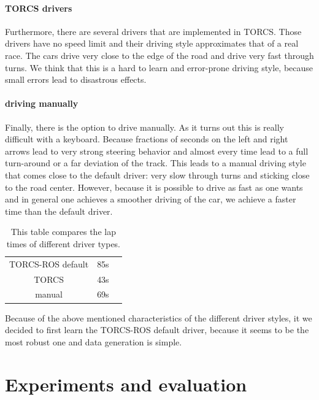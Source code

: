 \documentclass[10pt,a4paper,twoside,journal]{IEEEtran}
\begin{document}
\paragraph{TORCS drivers}
Furthermore, there are several drivers that are implemented in TORCS. Those drivers have no speed limit and their driving style approximates that of a real race. The cars drive very close to the edge of the road and drive very fast through turns. We think that this is a hard to learn and error-prone driving style, because small errors lead to disastrous effects.
\paragraph{driving manually}
Finally, there is the option to drive manually. As it turns out this is really difficult with a keyboard. Because fractions of seconds on the left and right arrows lead to very strong steering behavior and almost every time lead to a full turn-around or a far deviation of the track. This leads to a manual driving style that comes close to the default driver: very slow through turns and sticking close to the road center. However, because it is possible to drive as fast as one wants and in general one achieves a smoother driving of the car, we achieve a faster time than the default driver. \\

\begin{table}[ht]
	\centering
		\begin{tabular}{ |c|c|c| } 
			\hline
			TORCS-ROS default & 85s \\
			TORCS  & 43s  \\
			manual & 69s \\
			\hline
		\end{tabular}
		\caption{\label{tab:torcs_laptime}This table compares the lap times of different driver types.}
\end{table}
Because of the above mentioned characteristics of the different driver styles, it we decided to first learn the TORCS-ROS default driver, because it seems to be the most robust one and data generation is simple.

\section{Experiments and evaluation}
\label{sc:evaluation}
\end{document}
